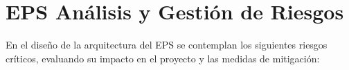 \chapter{EPS Análisis y Gestión de Riesgos}

En el diseño de la arquitectura del EPS se contemplan los siguientes riesgos críticos, evaluando su impacto en el proyecto y las medidas de mitigación:

